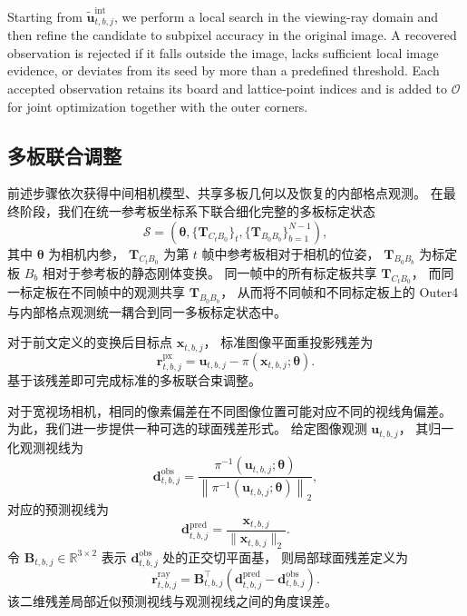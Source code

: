 \documentclass[letterpaper, 10 pt, conference]{ieeeconf}  %
\begin{document}
Starting from $\widetilde{\mathbf{u}}^{\mathrm{int}}_{t,b,j}$, we
perform a local search in the viewing-ray domain and then refine the
candidate to subpixel accuracy in the original image. A recovered
observation is rejected if it falls outside the image, lacks sufficient
local image evidence, or deviates from its seed by more than a predefined
threshold. Each accepted observation retains its board and lattice-point
indices and is added to $\mathcal{O}$ for joint optimization together
with the outer corners.

\subsection{多板联合调整}

前述步骤依次获得中间相机模型、共享多板几何以及恢复的内部格点观测。
在最终阶段，我们在统一参考板坐标系下联合细化完整的多板标定状态
\begin{equation}
\mathcal{S}
=
\left(
\boldsymbol{\theta},
\{\mathbf{T}_{C_tB_0}\}_{t},
\{\mathbf{T}_{B_0B_b}\}_{b=1}^{N-1}
\right),
\end{equation}
其中 $\boldsymbol{\theta}$ 为相机内参，
$\mathbf{T}_{C_tB_0}$ 为第 $t$ 帧中参考板相对于相机的位姿，
$\mathbf{T}_{B_0B_b}$ 为标定板 $B_b$ 相对于参考板的静态刚体变换。
同一帧中的所有标定板共享 $\mathbf{T}_{C_tB_0}$，
而同一标定板在不同帧中的观测共享 $\mathbf{T}_{B_0B_b}$，
从而将不同帧和不同标定板上的 Outer4 与内部格点观测统一耦合到同一多板标定状态中。

对于前文定义的变换后目标点 $\mathbf{x}_{t,b,j}$，
标准图像平面重投影残差为
\begin{equation}
\mathbf{r}^{\mathrm{px}}_{t,b,j}
=
\mathbf{u}_{t,b,j}
-
\pi(\mathbf{x}_{t,b,j};\boldsymbol{\theta}).
\end{equation}
基于该残差即可完成标准的多板联合束调整。

对于宽视场相机，相同的像素偏差在不同图像位置可能对应不同的视线角偏差。
为此，我们进一步提供一种可选的球面残差形式。
给定图像观测 $\mathbf{u}_{t,b,j}$，
其归一化观测视线为
\begin{equation}
\mathbf{d}^{\mathrm{obs}}_{t,b,j}
=
\frac{
\pi^{-1}(\mathbf{u}_{t,b,j};\boldsymbol{\theta})
}{
\left\|
\pi^{-1}(\mathbf{u}_{t,b,j};\boldsymbol{\theta})
\right\|_2
},
\end{equation}
对应的预测视线为
\begin{equation}
\mathbf{d}^{\mathrm{pred}}_{t,b,j}
=
\frac{\mathbf{x}_{t,b,j}}
{\|\mathbf{x}_{t,b,j}\|_2}.
\end{equation}
令 $\mathbf{B}_{t,b,j}\in\mathbb{R}^{3\times2}$
表示 $\mathbf{d}^{\mathrm{obs}}_{t,b,j}$ 处的正交切平面基，
则局部球面残差定义为
\begin{equation}
\mathbf{r}^{\mathrm{ray}}_{t,b,j}
=
\mathbf{B}_{t,b,j}^{\top}
\left(
\mathbf{d}^{\mathrm{pred}}_{t,b,j}
-
\mathbf{d}^{\mathrm{obs}}_{t,b,j}
\right).
\end{equation}
该二维残差局部近似预测视线与观测视线之间的角度误差。
\end{document}
